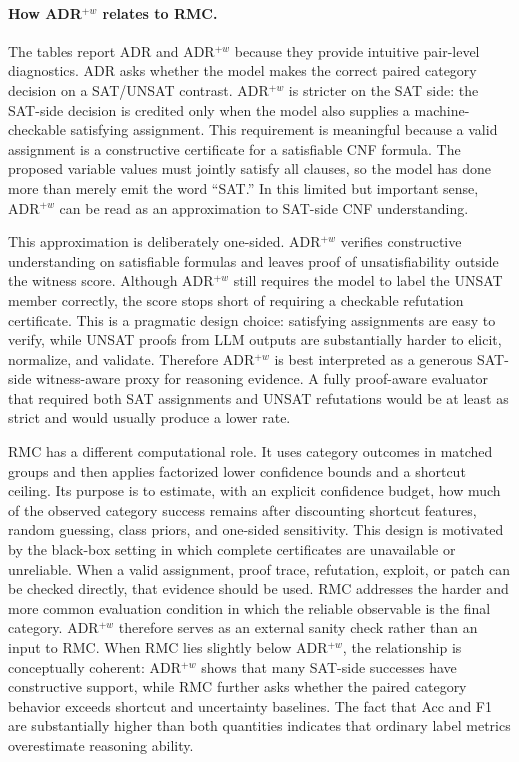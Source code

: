\documentclass[conference]{IEEEtran}
\theoremstyle{remark}
\begin{document}
\paragraph{How ADR$^{+w}$ relates to RMC.}
The tables report ADR and ADR$^{+w}$ because they provide intuitive pair-level diagnostics.  ADR asks whether the model makes the correct paired category decision on a SAT/UNSAT contrast.  ADR$^{+w}$ is stricter on the SAT side: the SAT-side decision is credited only when the model also supplies a machine-checkable satisfying assignment.  This requirement is meaningful because a valid assignment is a constructive certificate for a satisfiable CNF formula.  The proposed variable values must jointly satisfy all clauses, so the model has done more than merely emit the word ``SAT.''  In this limited but important sense, ADR$^{+w}$ can be read as an approximation to SAT-side CNF understanding.

This approximation is deliberately one-sided.  ADR$^{+w}$ verifies constructive understanding on satisfiable formulas and leaves proof of unsatisfiability outside the witness score.  Although ADR$^{+w}$ still requires the model to label the UNSAT member correctly, the score stops short of requiring a checkable refutation certificate.  This is a pragmatic design choice: satisfying assignments are easy to verify, while UNSAT proofs from LLM outputs are substantially harder to elicit, normalize, and validate.  Therefore ADR$^{+w}$ is best interpreted as a generous SAT-side witness-aware proxy for reasoning evidence.  A fully proof-aware evaluator that required both SAT assignments and UNSAT refutations would be at least as strict and would usually produce a lower rate.

RMC has a different computational role.  It uses category outcomes in matched groups and then applies factorized lower confidence bounds and a shortcut ceiling.  Its purpose is to estimate, with an explicit confidence budget, how much of the observed category success remains after discounting shortcut features, random guessing, class priors, and one-sided sensitivity.  This design is motivated by the black-box setting in which complete certificates are unavailable or unreliable.  When a valid assignment, proof trace, refutation, exploit, or patch can be checked directly, that evidence should be used.  RMC addresses the harder and more common evaluation condition in which the reliable observable is the final category.  ADR$^{+w}$ therefore serves as an external sanity check rather than an input to RMC.  When RMC lies slightly below ADR$^{+w}$, the relationship is conceptually coherent: ADR$^{+w}$ shows that many SAT-side successes have constructive support, while RMC further asks whether the paired category behavior exceeds shortcut and uncertainty baselines.  The fact that Acc and F1 are substantially higher than both quantities indicates that ordinary label metrics overestimate reasoning ability.
\end{document}
